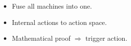 \documentclass[aspectratio=169]{beamer}
\begin{document}
\begin{frame}[fragile]
\begin{columns}[T]
    \vrule{}

    \begin{column}{8cm}
      \begin{itemize}
      \item<6-> Fuse all machines into one.
      \item<7-> Internal actions to action space.
      \item<8-> Mathematical proof $\Rightarrow$ trigger action.
      \end{itemize}
      \begin{center}
      \end{center}
    \end{column}
  \end{columns}

\end{frame}
\end{document}
